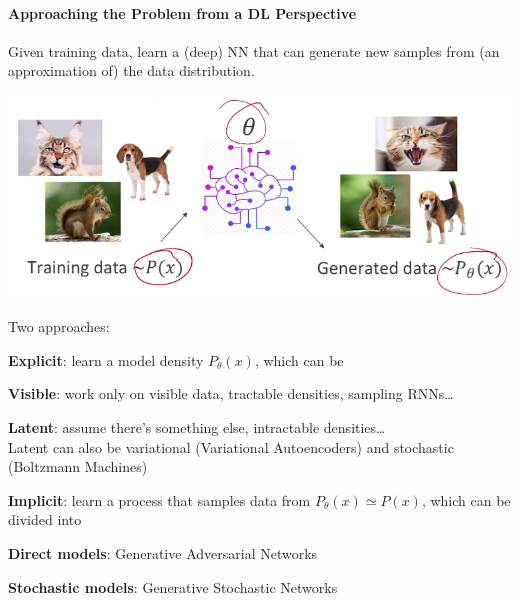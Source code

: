 \documentclass[10pt]{report}
\begin{document}
\paragraph{Approaching the Problem from a DL Perspective} Given training data, learn a (deep) NN that can generate new samples from (an approximation of) the data distribution.\begin{center}
	\includegraphics[scale=0.5]{139.png}
\end{center}
Two approaches:
\begin{list}{}{}
	\item \textbf{Explicit}: learn a model density $P_\theta(x)$, which can be 
	\begin{list}{}{}
		\item \textbf{Visible}: work only on visible data, tractable densities, sampling RNNs\ldots
		\item \textbf{Latent}: assume there's something else, intractable densities\ldots\\
		Latent can also be variational (Variational Autoencoders) and stochastic (Boltzmann Machines)
\end{list}		
	\item \textbf{Implicit}: learn a process that samples data from $P_\theta(x)\simeq P(x)$, which can be divided into
	\begin{list}{}{}
		\item \textbf{Direct models}: Generative Adversarial Networks
		\item \textbf{Stochastic models}: Generative Stochastic Networks
	\end{list}
\end{list}
\end{document}
